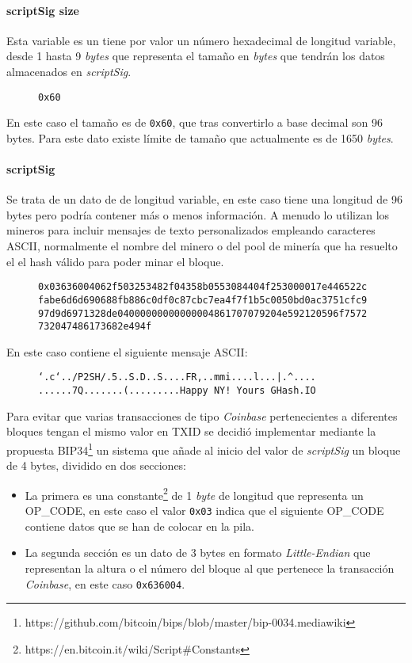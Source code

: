 \documentclass{article}
\begin{document}
    \paragraph{scriptSig size}
    Esta variable es un tiene por valor un número hexadecimal de longitud variable, desde 1 hasta 9 \textit{bytes} que representa el tamaño en \textit{bytes} que tendrán los datos almacenados en \textit{scriptSig}.
    \begin{figure}[H]
        \texttt{0x60}
    \end{figure}
    En este caso el tamaño es de \texttt{0x60}, que tras convertirlo a base decimal son 96 bytes. Para este dato existe límite de tamaño que actualmente es de 1650 \textit{bytes}.
    
    \paragraph{scriptSig}
    Se trata de un dato de de longitud variable, en este caso tiene una longitud de 96 bytes pero podría contener más o menos información. A menudo lo utilizan los mineros para incluir mensajes de texto personalizados empleando caracteres ASCII, normalmente el nombre del minero o del pool de minería que ha resuelto el el hash válido para poder minar el bloque.
    \begin{figure}[H]
        \texttt{0x03636004062f503253482f04358b0553084404f253000017e446522c} \\
        \texttt{fabe6d6d690688fb886c0df0c87cbc7ea4f7f1b5c0050bd0ac3751cfc9}
        \texttt{97d9d6971328de04000000000000004861707079204e592120596f7572}
        \texttt{732047486173682e494f}
    \end{figure}
    
    En este caso contiene el siguiente mensaje ASCII:
    \begin{figure}[H]
    \centering
        \texttt{`.c`../P2SH/.5..S.D..S....FR,..mmi....l...|.\textasciicircum....}
        \texttt{......7Q.......(.........Happy NY! Yours GHash.IO}
    \end{figure}
    
    Para evitar que varias transacciones de tipo \textit{Coinbase} pertenecientes a diferentes bloques tengan el mismo valor en TXID se decidió implementar mediante la propuesta BIP34\footnote{https://github.com/bitcoin/bips/blob/master/bip-0034.mediawiki} un sistema que añade al inicio del valor de \textit{scriptSig} un bloque de 4 bytes, dividido en dos secciones:
    
    \begin{itemize}
    \item La primera es una constante\footnote{https://en.bitcoin.it/wiki/Script\#Constants} de 1 \textit{byte} de longitud que representa un OP\_CODE, en este caso el valor \texttt{0x03} indica que el siguiente OP\_CODE contiene datos que se han de colocar en la pila.
    \item La segunda sección es un dato de 3 bytes en formato \textit{Little-Endian} que representan la altura o el número del bloque al que pertenece la transacción \textit{Coinbase}, en este caso \texttt{0x636004}.
    \end{itemize}
    
\end{document}
